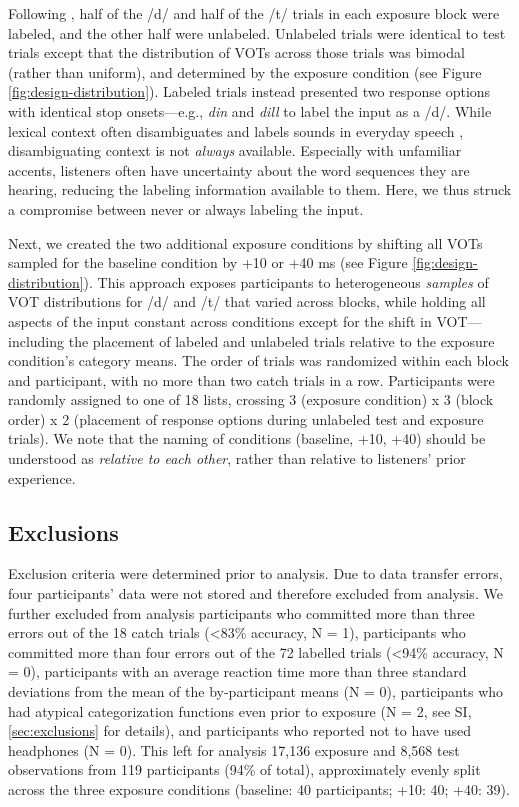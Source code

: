 \documentclass[
  11pt,
  man,mask,floatsintext]{apa6}
\begin{document}
Following \textcite{kleinschmidt2015}, half of the /d/ and half of the /t/ trials in each exposure block were labeled, and the other half were unlabeled. Unlabeled trials were identical to test trials except that the distribution of VOTs across those trials was bimodal (rather than uniform), and determined by the exposure condition (see Figure \ref{fig:design-distribution}). Labeled trials instead presented two response options with identical stop onsets---e.g., \emph{din} and \emph{dill} to label the input as a /d/. While lexical context often disambiguates and labels sounds in everyday speech \autocites[facilitating adaptation,][]{burchill2023,burchill2018}, disambiguating context is not \emph{always} available. Especially with unfamiliar accents, listeners often have uncertainty about the word sequences they are hearing, reducing the labeling information available to them. Here, we thus struck a compromise between never or always labeling the input.

Next, we created the two additional exposure conditions by shifting all VOTs sampled for the baseline condition by +10 or +40 ms (see Figure \ref{fig:design-distribution}). This approach exposes participants to heterogeneous \emph{samples} of VOT distributions for /d/ and /t/ that varied across blocks, while holding all aspects of the input constant across conditions except for the shift in VOT---including the placement of labeled and unlabeled trials relative to the exposure condition's category means. The order of trials was randomized within each block and participant, with no more than two catch trials in a row. Participants were randomly assigned to one of 18 lists, crossing 3 (exposure condition) x 3 (block order) x 2 (placement of response options during unlabeled test and exposure trials). We note that the naming of conditions (baseline, +10, +40) should be understood as \emph{relative to each other}, rather than relative to listeners' prior experience.

\subsection{Exclusions}\label{exclusions}

Exclusion criteria were determined prior to analysis. Due to data transfer errors, four participants' data were not stored and therefore excluded from analysis. We further excluded from analysis participants who committed more than three errors out of the 18 catch trials (\textless83\% accuracy, N = 1), participants who committed more than four errors out of the 72 labelled trials (\textless94\% accuracy, N = 0), participants with an average reaction time more than three standard deviations from the mean of the by-participant means (N = 0), participants who had atypical categorization functions even prior to exposure (N = 2, see SI, \ref{sec:exclusions} for details), and participants who reported not to have used headphones (N = 0). This left for analysis 17,136 exposure and 8,568 test observations from 119 participants (94\% of total), approximately evenly split across the three exposure conditions (baseline: 40 participants; +10: 40; +40: 39).
\end{document}
